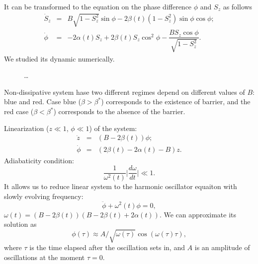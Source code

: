 \documentclass[aps, pre, preprint, groupedaddress, superscriptaddress, showkeys, showpacs] {revtex4-1}
\begin{document}
It can be transformed to the equation on the phase difference $\phi$ and $S_z$ as follows
%
\begin{equation}
\begin{array}{lcl}
\dot{S}_z & = & B \sqrt{1 - S_z^2} \sin \phi - 2 \beta(t) (1 - S_z^2) \sin \phi \cos \phi; \\[10pt]
\dot{\phi} & = &  -2 \alpha(t) S_z + 2 \beta(t) S_z \cos^2 \phi - \dfrac{B S_z \cos \phi}{\sqrt{1 - S_z^2}}.
\end{array}
\end{equation}
%
We studied its dynamic numerically.
%
\begin{figure}[ht]
\caption{\dots}
\label{pic:phase}
\end{figure}
%
Non-dissipative system hase two different regimes depend on different values of $B$: blue and red.
Case blue ($\beta > \beta^*$) corresponds to the existence of barrier, and the red case ($\beta < \beta^*$) corresponds to the absence of the barrier.

Linearization ($z \ll 1$, $\phi \ll 1$) of the system:
%
\begin{equation}
\begin{array}{lcl}
\dot{z} & = & (B - 2\beta(t)) \phi; \\
\dot{\phi} & = & (2 \beta(t) - 2 \alpha(t) - B) z.
\end{array}
\end{equation}
%
Adiabaticity condition:
%
\begin{equation}
\dfrac{1}{\omega^2(t)} \Big| \dfrac{d \omega}{d t} \Big| \ll 1.
\end{equation}
%
It allows us to reduce linear system to the harmonic oscillator equaiton with slowly evolving frequency:
%
\begin{equation}
\ddot{\phi} + \omega^2(t) \phi = 0,
\end{equation}
%
$\omega(t) = (B - 2\beta(t))(B - 2 \beta(t) + 2 \alpha(t))$.
We can approximate its solution as
%
\begin{equation}
\phi(\tau) \approx A / \sqrt{\omega(\tau)} \cos (\omega(\tau) \tau),
\end{equation}
%
where $\tau$ is the time elapsed after the oscillation sets in, and $A$ is an amplitude of oscillations at the moment $\tau = 0$.
\end{document}
